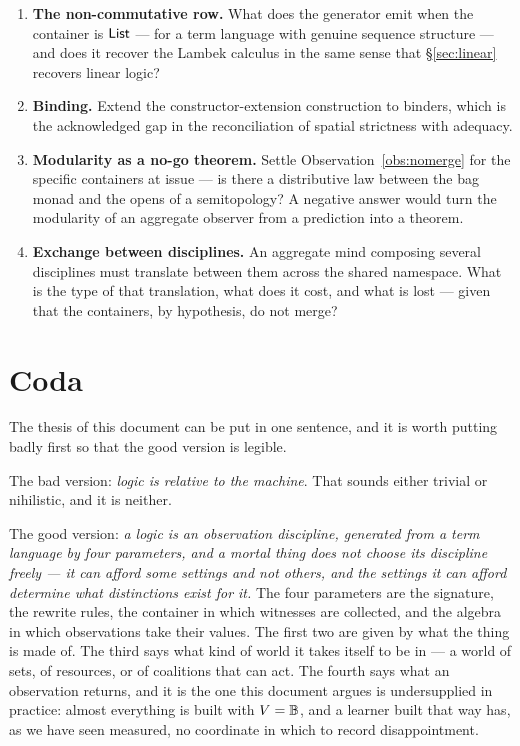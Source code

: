 \begin{enumerate}[label=O\arabic*.,leftmargin=2.6em]
observation than the modality itself.
\item \textbf{The non-commutative row.} What does the generator emit when the
container is $\mathsf{List}$ --- for a term language with genuine sequence structure --- and
does it recover the Lambek calculus in the same sense that \S\ref{sec:linear}
recovers linear logic?
\item \textbf{Binding.} Extend the constructor-extension construction to binders,
which is the acknowledged gap in the reconciliation of spatial strictness with
adequacy.
\item \textbf{Modularity as a no-go theorem.} Settle
Observation~\ref{obs:nomerge} for the specific containers at issue --- is there a
distributive law between the bag monad and the opens of a semitopology? A negative
answer would turn the modularity of an aggregate observer from a prediction into a
theorem.
\item \textbf{Exchange between disciplines.} An aggregate mind composing several
disciplines must translate between them across the shared namespace. What is the
type of that translation, what does it cost, and what is lost --- given that the
containers, by hypothesis, do not merge?
\end{enumerate}

\section{Coda}
\label{sec:coda}

The thesis of this document can be put in one sentence, and it is worth putting
badly first so that the good version is legible.

The bad version: \emph{logic is relative to the machine}. That sounds either
trivial or nihilistic, and it is neither.

The good version: \emph{a logic is an observation discipline, generated from a term
language by four parameters, and a mortal thing does not choose its discipline
freely --- it can afford some settings and not others, and the settings it can
afford determine what distinctions exist for it.} The four parameters are the
signature, the rewrite rules, the container in which witnesses are collected, and
the algebra in which observations take their values. The first two are given by
what the thing is made of. The third says what kind of world it takes itself to be
in --- a world of sets, of resources, or of coalitions that can act. The fourth
says what an observation returns, and it is the one this document argues is
undersupplied in practice: almost everything is built with $V = \mathbb{B}$, and a
learner built that way has, as we have seen measured, no coordinate in which to
record disappointment.

